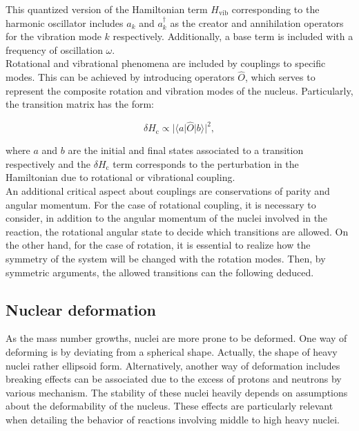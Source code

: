 \documentclass[openany]{book}
\begin{document}
This quantized version of the Hamiltonian term $H_{\mathrm{vib}}$ corresponding to the harmonic oscillator includes $a_k$ and $a^{\dagger}_k$ as the creator and annihilation operators for the vibration mode $k$ respectively. Additionally, a base term is included with a frequency of oscillation $\omega$. \\

Rotational and vibrational phenomena are included by couplings to specific modes. This can be achieved by introducing operators $\hat O$, which serves to represent the composite rotation and vibration modes of the nucleus. Particularly, the transition matrix has the form: 

\begin{equation}\label{eq:nuclearMotion_coupling}
	\delta H_{\mathrm{c}} \propto |\langle a | \hat O| b \rangle|^{2},
\end{equation}

where $a$ and $b$ are the initial and final states associated to a transition respectively and the $	\delta H_{\mathrm{c}}$ term corresponds to the perturbation in the Hamiltonian due to rotational or vibrational coupling. \\

An additional critical aspect about couplings are conservations of parity and angular momentum. For the case of rotational coupling, it is necessary to consider, in addition to the angular momentum of the nuclei involved in the reaction, the rotational angular state to decide which transitions are allowed. On the other hand, for the case of rotation, it is essential to realize how the symmetry of the system will be changed with the rotation modes. Then, by symmetric arguments, the allowed transitions can the following deduced.  

\subsection{Nuclear deformation}  \label{sub:nuclearDeformation}

As the mass number growths, nuclei are more prone to be deformed. One way of deforming is by deviating from a  spherical shape. Actually, the shape of heavy nuclei rather ellipsoid form. Alternatively, another way of deformation includes breaking effects can be associated due to the excess of protons and neutrons by various mechanism. The stability of these nuclei heavily depends on assumptions about the deformability of the nucleus. These effects are particularly relevant when detailing the behavior of reactions involving middle to high heavy nuclei. \\
\end{document}
